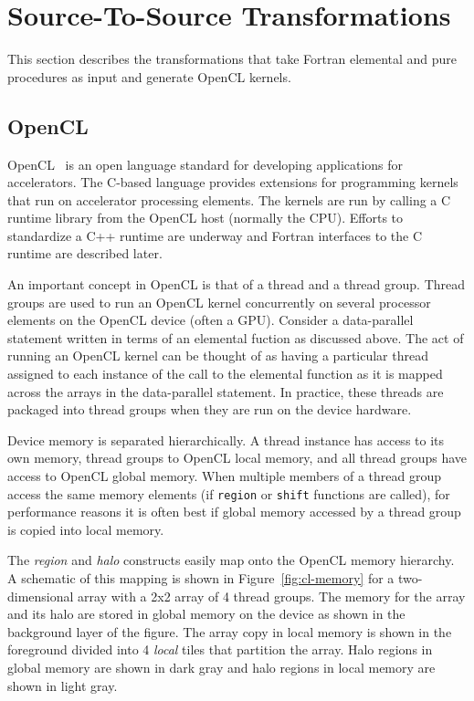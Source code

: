 \section{Source-To-Source Transformations}

This section describes the transformations that take Fortran elemental and
pure procedures as input and generate OpenCL kernels.

\subsection{OpenCL}

OpenCL~\cite{opencl08} is an open language standard for developing
applications for accelerators.  The C-based language provides extensions for
programming kernels that run on accelerator processing elements.  The kernels
are run by calling a C runtime library from the OpenCL host (normally the
CPU).  Efforts to standardize a C++ runtime are underway and Fortran
interfaces to the C runtime are described later.

An important concept in OpenCL is that of a thread and a thread group.  Thread
groups are used to run an OpenCL kernel concurrently on several processor
elements on the OpenCL device (often a GPU).  Consider a data-parallel
statement written in terms of an elemental fuction as discussed above.  The
act of running an OpenCL kernel can be thought of as having a particular
thread assigned to each instance of the call to the elemental function as it
is mapped across the arrays in the data-parallel statement.  In practice,
these threads are packaged into thread groups when they are run on the device
hardware.

Device memory is separated hierarchically.  A thread instance has access to
its own memory, thread groups to OpenCL local memory, and all thread groups
have access to OpenCL global memory.  When multiple members of a thread group
access the same memory elements (if {\tt region} or {\tt shift}
functions are called), for performance reasons it is often best if global
memory accessed by a thread group is copied into local memory.

The \emph{region} and \emph{halo} constructs easily map onto the OpenCL memory
hierarchy.  A schematic of this mapping is shown in Figure~\ref{fig:cl-memory}
for a two-dimensional array with a 2x2 array of 4 thread groups.  The memory
for the array and its halo are stored in global memory on the device as shown
in the background layer of the figure.  The array copy in local memory is
shown in the foreground divided into 4 \emph{local} tiles that partition the
array.  Halo regions in global memory are shown in dark gray and halo regions
in local memory are shown in light gray.

